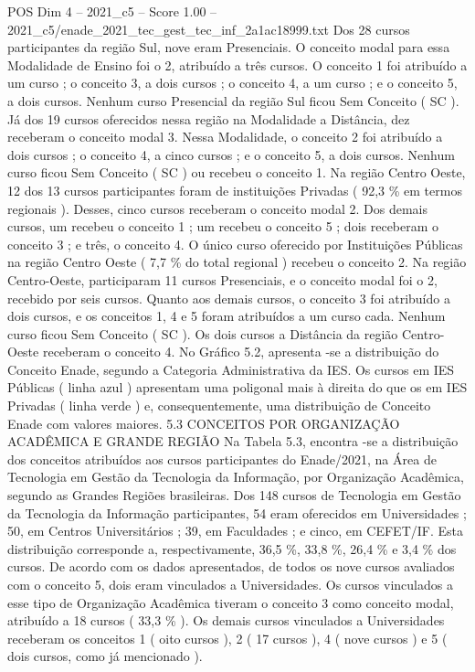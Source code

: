 \begin{textsample}{POS Dim 4 – 2021\_c5 – Score 1.00 – 2021\_c5/enade\_2021\_tec\_gest\_tec\_inf\_2a1ac18999.txt}
Dos 28 cursos participantes da região Sul, nove eram Presenciais.
O conceito modal para essa Modalidade de Ensino foi o 2, atribuído a três cursos.
O conceito 1 foi atribuído a um curso ; o conceito 3, a dois cursos ; o conceito 4, a um curso ; e o conceito 5, a dois cursos.
Nenhum curso Presencial da região Sul ficou Sem Conceito ( SC ).
Já dos 19 cursos oferecidos nessa região na Modalidade a Distância, dez receberam o conceito modal 3.
Nessa Modalidade, o conceito 2 foi atribuído a dois cursos ; o conceito 4, a cinco cursos ; e o conceito 5, a dois cursos.
Nenhum curso ficou Sem Conceito ( SC ) ou recebeu o conceito 1.
Na região Centro Oeste, 12 dos 13 cursos participantes foram de instituições Privadas ( 92,3 \% em termos regionais ).
Desses, cinco cursos receberam o conceito modal 2.
Dos demais cursos, um recebeu o conceito 1 ; um recebeu o conceito 5 ; dois receberam o conceito 3 ; e três, o conceito 4.
O único curso oferecido por Instituições Públicas na região Centro Oeste ( 7,7 \% do total regional ) recebeu o conceito 2.
Na região Centro-Oeste, participaram 11 cursos Presenciais, e o conceito modal foi o 2, recebido por seis cursos.
Quanto aos demais cursos, o conceito 3 foi atribuído a dois cursos, e os conceitos 1, 4 e 5 foram atribuídos a um curso cada.
Nenhum curso ficou Sem Conceito ( SC ).
Os dois cursos a Distância da região Centro-Oeste receberam o conceito 4.
No Gráfico 5.2, apresenta -se a distribuição do Conceito Enade, segundo a Categoria Administrativa da IES.
Os cursos em IES Públicas ( linha azul ) apresentam uma poligonal mais à direita do que os em IES Privadas ( linha verde ) e, consequentemente, uma distribuição de Conceito Enade com valores maiores. 5.3 CONCEITOS POR ORGANIZAÇÃO ACADÊMICA E GRANDE REGIÃO Na Tabela 5.3, encontra -se a distribuição dos conceitos atribuídos aos cursos participantes do Enade/2021, na Área de Tecnologia em Gestão da Tecnologia da Informação, por Organização Acadêmica, segundo as Grandes Regiões brasileiras.
Dos 148 cursos de Tecnologia em Gestão da Tecnologia da Informação participantes, 54 eram oferecidos em Universidades ; 50, em Centros Universitários ; 39, em Faculdades ; e cinco, em CEFET/IF.
Esta distribuição corresponde a, respectivamente, 36,5 \%, 33,8 \%, 26,4 \% e 3,4 \% dos cursos.
De acordo com os dados apresentados, de todos os nove cursos avaliados com o conceito 5, dois eram vinculados a Universidades.
Os cursos vinculados a esse tipo de Organização Acadêmica tiveram o conceito 3 como conceito modal, atribuído a 18 cursos ( 33,3 \% ).
Os demais cursos vinculados a Universidades receberam os conceitos 1 ( oito cursos ), 2 ( 17 cursos ), 4 ( nove cursos ) e 5 ( dois cursos, como já mencionado ).

\end{textsample}

